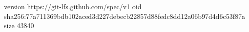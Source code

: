 version https://git-lfs.github.com/spec/v1
oid sha256:77a711369bdb102aced3d227debecb22857d88fedc8dd12a06b97d4d6c53f87a
size 43840
